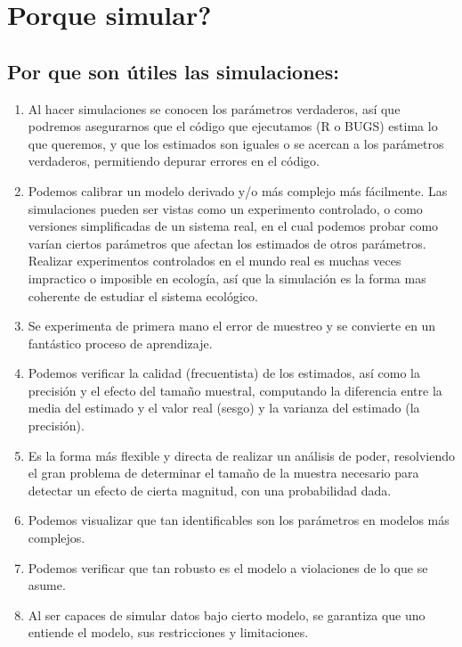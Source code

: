 \documentclass[]{book}
\providecommand{\tightlist}{%
  \setlength{\itemsep}{0pt}\setlength{\parskip}{0pt}}
\begin{document}
\chapter{Porque simular?}\label{why_sumul}

\section{Por que son útiles las
simulaciones:}\label{por-que-son-utiles-las-simulaciones}

\begin{enumerate}
\def\labelenumi{\arabic{enumi}.}
\tightlist
\item
  Al hacer simulaciones se conocen los parámetros verdaderos, así que
  podremos asegurarnos que el código que ejecutamos (R o BUGS) estima lo
  que queremos, y que los estimados son iguales o se acercan a los
  parámetros verdaderos, permitiendo depurar errores en el código.
\item
  Podemos calibrar un modelo derivado y/o más complejo más fácilmente.
  Las simulaciones pueden ser vistas como un experimento controlado, o
  como versiones simplificadas de un sistema real, en el cual podemos
  probar como varían ciertos parámetros que afectan los estimados de
  otros parámetros. Realizar experimentos controlados en el mundo real
  es muchas veces impractico o imposible en ecología, así que la
  simulación es la forma mas coherente de estudiar el sistema ecológico.
\item
  Se experimenta de primera mano el error de muestreo y se convierte en
  un fantástico proceso de aprendizaje.
\item
  Podemos verificar la calidad (frecuentista) de los estimados, así como
  la precisión y el efecto del tamaño muestral, computando la diferencia
  entre la media del estimado y el valor real (sesgo) y la varianza del
  estimado (la precisión).
\item
  Es la forma más flexible y directa de realizar un análisis de poder,
  resolviendo el gran problema de determinar el tamaño de la muestra
  necesario para detectar un efecto de cierta magnitud, con una
  probabilidad dada.\\
\item
  Podemos visualizar que tan identificables son los parámetros en
  modelos más complejos.
\item
  Podemos verificar que tan robusto es el modelo a violaciones de lo que
  se asume.
\item
  Al ser capaces de simular datos bajo cierto modelo, se garantiza que
  uno entiende el modelo, sus restricciones y limitaciones.
\end{enumerate}
\end{document}
